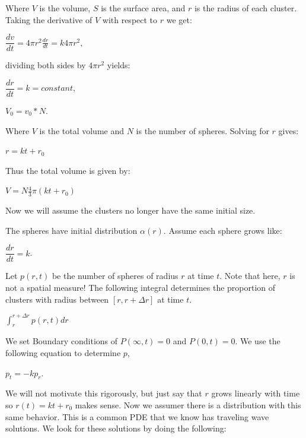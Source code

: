 \documentclass[]{article}
\numberwithin{equation}{section}		%
\begin{document}
Where $V$ is the volume, $S$ is the surface area, and $r$ is the radius of each cluster. Taking the derivative of $V$ with respect to $r$ we get:
\begin{center}
$\dfrac{dv}{dt}=4\pi r^{2}\frac{dr}{dt}=k4\pi r^{2},$ 
\end{center}
dividing both sides by $4\pi r^{2}$ yields:
\begin{center}
$\dfrac{dr}{dt}= k=constant,$
\end{center}
\begin{center}
$V_{0}= v_{0}*N. $
\end{center}


Where $V$ is the total volume and $N$ is the number of spheres. Solving for $r$ gives:


\begin{center}
$r = kt+r_{0}$
\end{center}

Thus the total volume is given by:

\begin{center}
$V = N\frac{4}{3}\pi(kt+r_{0})$ 
\end{center}

Now we will assume the clusters no longer have the same initial size.


The spheres have initial distribution $\alpha(r)$. Assume each sphere grows like:
\begin{center}
 $\dfrac{dr}{dt}=k$.
 \end{center}

Let $p(r,t)$ be the number of spheres of radius $r$ at time $t$. Note that here, $r$ is not a spatial measure! The following integral determines the proportion of clusters with radius between $[r,r + \Delta r]$ at time $t$.
\begin{center}
$\int_{r}^{r+\Delta r}p(r,t )dr$
\end{center}




We set Boundary conditions of $P(\infty, t )=0$ and $P (0,t )=0$. We use the following equation to determine $p$,

\begin{center}
$p_{t} = -kp_{r}.$
\end{center} 

We will not motivate this rigorously, but just say that $r$ grows linearly with time so $r(t)=kt+r_0$ makes sense. Now we assumer there is a distribution with this same behavior. This is a common PDE that we know has traveling wave solutions. We look for these solutions by doing the following:
\end{document}
